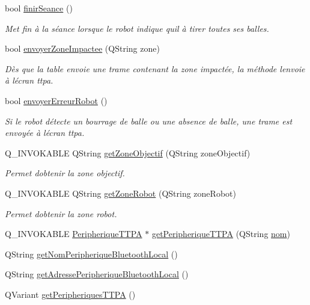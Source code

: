 \begin{DoxyCompactItemize}
bool \hyperlink{class_communication_bluetooth_ab2170ef9c868ac2a26b76675c71f770e}{finir\+Seance} ()
\begin{DoxyCompactList}\small\item\em Met fin à la séance lorsque le robot indique qu\textquotesingle{}il à tirer toutes ses balles. \end{DoxyCompactList}\item 
bool \hyperlink{class_communication_bluetooth_a5906cd18db7ce9467452acf0ed845f23}{envoyer\+Zone\+Impactee} (Q\+String zone)
\begin{DoxyCompactList}\small\item\em Dès que la table envoie une trame contenant la zone impactée, la méthode l\textquotesingle{}envoie à l\textquotesingle{}écran ttpa. \end{DoxyCompactList}\item 
bool \hyperlink{class_communication_bluetooth_a891295407273a810ef9300e743bc34f9}{envoyer\+Erreur\+Robot} ()
\begin{DoxyCompactList}\small\item\em Si le robot détecte un bourrage de balle ou une absence de balle, une trame est envoyée à l\textquotesingle{}écran ttpa. \end{DoxyCompactList}\item 
Q\+\_\+\+I\+N\+V\+O\+K\+A\+B\+LE Q\+String \hyperlink{class_communication_bluetooth_a6fcee1677888958590d5f80a5149aabf}{get\+Zone\+Objectif} (Q\+String zone\+Objectif)
\begin{DoxyCompactList}\small\item\em Permet d\textquotesingle{}obtenir la zone objectif. \end{DoxyCompactList}\item 
Q\+\_\+\+I\+N\+V\+O\+K\+A\+B\+LE Q\+String \hyperlink{class_communication_bluetooth_a1660fbcba9b118755a57e46543868f80}{get\+Zone\+Robot} (Q\+String zone\+Robot)
\begin{DoxyCompactList}\small\item\em Permet d\textquotesingle{}obtenir la zone robot. \end{DoxyCompactList}\item 
Q\+\_\+\+I\+N\+V\+O\+K\+A\+B\+LE \hyperlink{class_peripherique_t_t_p_a}{Peripherique\+T\+T\+PA} $\ast$ \hyperlink{class_communication_bluetooth_a1baec10cc16afe1a87cbad635a82c323}{get\+Peripherique\+T\+T\+PA} (Q\+String \hyperlink{class_communication_bluetooth_a320cc60a0cb6b4ea9e009fef2853f1d2}{nom})
\item 
Q\+String \hyperlink{class_communication_bluetooth_a20694d5121f78fe4b83b1ef93a2dd5d1}{get\+Nom\+Peripherique\+Bluetooth\+Local} ()
\item 
Q\+String \hyperlink{class_communication_bluetooth_affe39c52a35aec101c04d333b6249162}{get\+Adresse\+Peripherique\+Bluetooth\+Local} ()
\item 
Q\+Variant \hyperlink{class_communication_bluetooth_a08f0efb9f8a5a9f0660aad870032b9d3}{get\+Peripheriques\+T\+T\+PA} ()
\end{DoxyCompactItemize}
